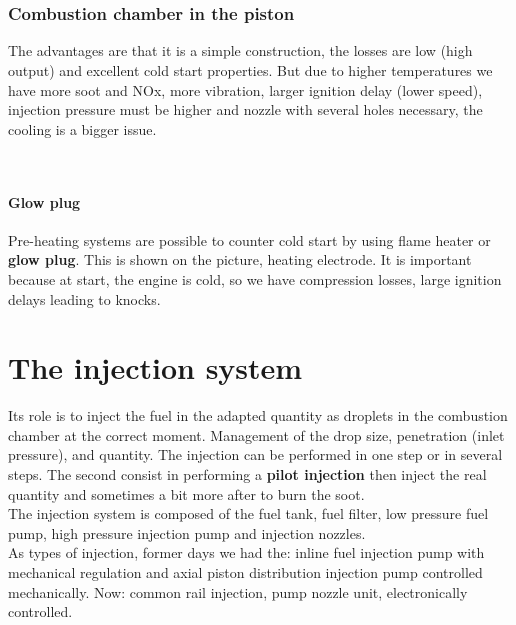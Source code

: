 	\ \\\\
	
\subsubsection{Combustion chamber in the piston}
	 The advantages are that it is a simple construction, the losses are low (high output) and excellent cold start properties. But due to higher temperatures we have more soot and NOx, more vibration, larger ignition delay (lower speed), injection pressure must be higher and nozzle with several holes necessary, the cooling is a bigger issue. 
	 
	 \ \\
\paragraph{Glow plug}
	Pre-heating systems are possible to counter cold start by using flame heater or \textbf{glow plug}. This is shown on the picture, heating electrode. It is important because at start, the engine is cold, so we have compression losses, large ignition delays leading to knocks. 
	
\section{The injection system}
	Its role is to inject the fuel in the adapted quantity as droplets in the combustion chamber at the correct moment. Management of the drop size, penetration (inlet pressure), and quantity. The injection can be performed in one step or in several steps. The second consist in performing a \textbf{pilot injection} then inject the real quantity and sometimes a bit more after to burn the soot. \\
	
	The injection system is composed of the fuel tank, fuel filter, low pressure fuel pump, high pressure injection pump and injection nozzles. \\
	
	As types of injection, former days we had the: inline fuel injection pump with mechanical regulation and axial piston distribution injection pump controlled mechanically. Now: common rail injection, pump nozzle unit, electronically controlled.
	
	
